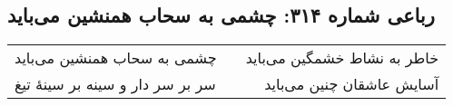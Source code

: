 \begin{center}
\section*{رباعی شماره ۳۱۴: چشمی به سحاب همنشین می‌باید}
\label{sec:sh314}
\begin{longtable}{l p{0.5cm} r}
چشمی به سحاب همنشین می‌باید
&&
خاطر به نشاط خشمگین می‌باید
\\
سر بر سر دار و سینه بر سینهٔ تیغ
&&
آسایش عاشقان چنین می‌باید
\\
\end{longtable}
\end{center}
